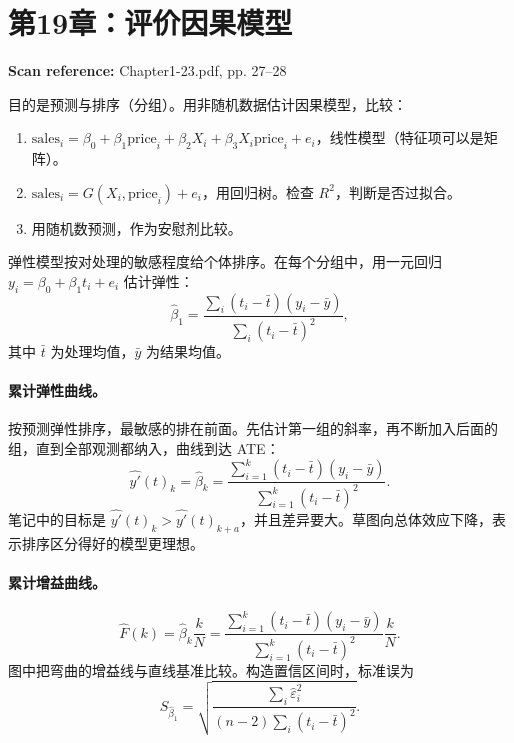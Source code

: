 \documentclass[11pt,a4paper]{article}
\newcommand{\sourcepages}[1]{\par{\small\sffamily\color{muted}\textbf{Scan reference:} #1\par}\nobreak\smallskip\nopagebreak[4]}
\begin{document}
{\section{第19章：评价因果模型}
\sourcepages{Chapter1-23.pdf, pp. 27--28}
目的是预测与排序（分组）。用非随机数据估计因果模型，比较：
\begin{enumerate}
\item $\mathrm{sales}_i=\beta_0+\beta_1\mathrm{price}_i+\beta_2X_i+\beta_3X_i\mathrm{price}_i+e_i$，线性模型（特征项可以是矩阵）。
\item $\mathrm{sales}_i=G(X_i,\mathrm{price}_i)+e_i$，用回归树。检查 $R^2$，判断是否过拟合。
\item 用随机数预测，作为安慰剂比较。
\end{enumerate}
弹性模型按对处理的敏感程度给个体排序。在每个分组中，用一元回归 $y_i=\beta_0+\beta_1t_i+e_i$ 估计弹性：
\[\hat\beta_1=\frac{\sum_i(t_i-\bar t)(y_i-\bar y)}{\sum_i(t_i-\bar t)^2},\]
其中 $\bar t$ 为处理均值，$\bar y$ 为结果均值。

\paragraph{累计弹性曲线。}
按预测弹性排序，最敏感的排在前面。先估计第一组的斜率，再不断加入后面的组，直到全部观测都纳入，曲线到达 ATE：
\[\widehat{y'}(t)_k=\hat\beta_k=
\frac{\sum_{i=1}^{k}(t_i-\bar t)(y_i-\bar y)}{\sum_{i=1}^{k}(t_i-\bar t)^2}.\]
笔记中的目标是 $\widehat{y'}(t)_k>\widehat{y'}(t)_{k+a}$，并且差异要大。草图向总体效应下降，表示排序区分得好的模型更理想。

\paragraph{累计增益曲线。}
\[\widehat F(k)=\hat\beta_k\frac{k}{N}
=\frac{\sum_{i=1}^{k}(t_i-\bar t)(y_i-\bar y)}{\sum_{i=1}^{k}(t_i-\bar t)^2}\frac{k}{N}.\]
图中把弯曲的增益线与直线基准比较。构造置信区间时，标准误为
\[S_{\hat\beta_1}=\sqrt{\frac{\sum_i\hat\varepsilon_i^2}{(n-2)\sum_i(t_i-\bar t)^2}}.\]

\begin{center}
\end{center}}
\end{document}
